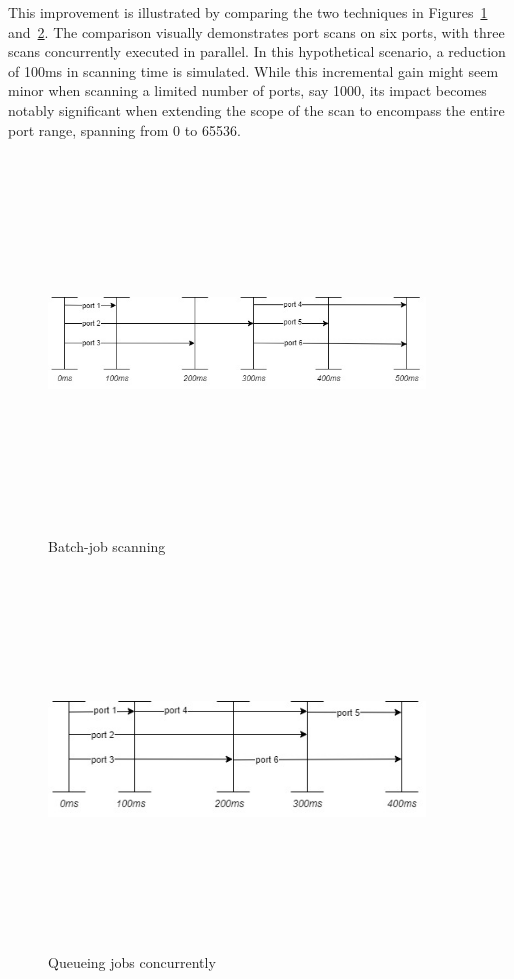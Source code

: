 This improvement is illustrated by comparing the two techniques in Figures~\ref{fig:batch-job} and~\ref{fig:queue-job}. The comparison visually demonstrates port scans on six ports, with three scans concurrently executed in parallel. In this hypothetical scenario, a reduction of 100ms in scanning time is simulated. While this incremental gain might seem minor when scanning a limited number of ports, say 1000, its impact becomes notably significant when extending the scope of the scan to encompass the entire port range, spanning from 0 to 65536.

\begin{figure}[htbp]
    \centering
\includegraphics[width=10cm, height=10cm, keepaspectratio]{port_scanning_techniques/img/batch-job.jpg}
    \caption{Batch-job scanning}
    \label{fig:batch-job}
\end{figure}

\begin{figure}[htbp]
    \centering
\includegraphics[width=10cm, height=10cm, keepaspectratio]{port_scanning_techniques/img/queue-job.jpg}
    \caption{Queueing jobs concurrently}
    \label{fig:queue-job}
\end{figure}

